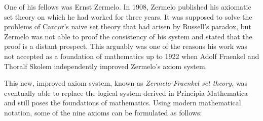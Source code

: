 \documentclass[hidelinks]{article}
\begin{document}
One of his fellows was Ernst Zermelo. In 1908, Zermelo published his axiomatic set theory on which he had worked for three years. It was supposed to solve the problems of Cantor's naive set theory that had arisen by Russell's paradox, but Zermelo was not able to proof the consistency of his system and stated that the proof is a distant prospect. This arguably was one of the reasons his work was not accepted as a foundation of mathematics up to 1922 when Adolf Fraenkel and Thoralf Skolem independently improved Zermelo's axiom system. 

This new, improved axiom system, known as \textit{Zermelo-Fraenkel set theory}, was eventually able to replace the logical system derived in Principia Mathematica and still poses the foundations of mathematics. Using modern mathematical notation, some of the nine axioms can be formulated as follows:
\small
\end{document}
